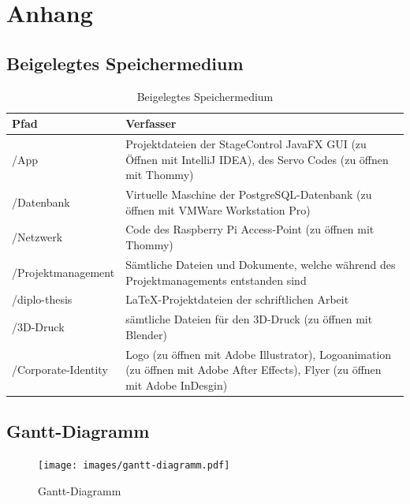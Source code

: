\chapter*{Anhang}

\section*{Beigelegtes Speichermedium}

\begin{table}[h]
	\centering
	\begin{tabular}{l p{12cm}}
		\textbf{Pfad} & \textbf{Verfasser} \\ 
		\hline
		/App & Projektdateien der StageControl JavaFX GUI (zu Öffnen mit IntelliJ IDEA), des Servo Codes (zu öffnen mit Thommy)\\
		/Datenbank & Virtuelle Maschine der PostgreSQL-Datenbank (zu öffnen mit VMWare Workstation Pro) \\ 
		/Netzwerk & Code des Raspberry Pi Access-Point (zu öffnen mit Thommy) \\ 
		/Projektmanagement & Sämtliche Dateien und Dokumente, welche während des Projektmanagements entstanden sind \\ 
		/diplo-thesis & LaTeX-Projektdateien der schriftlichen Arbeit \\ 
		/3D-Druck & sämtliche Dateien für den 3D-Druck (zu öffnen mit Blender) \\ 
		/Corporate-Identity & Logo (zu öffnen mit Adobe Illustrator), Logoanimation (zu öffnen mit Adobe After Effects), Flyer (zu öffnen mit Adobe InDesgin) \\ 
	\end{tabular}
	\caption{Beigelegtes Speichermedium}
\end{table}


\section*{Gantt-Diagramm}

\begin{figure}[H]
	\centering
	\texttt{[image: images/gantt-diagramm.pdf]}
	\caption[Gantt-Diagramm]{Gantt-Diagramm}
	\label{fig:gantt-diagramm}
\end{figure}



